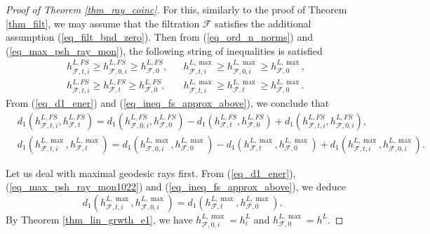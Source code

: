\documentclass[12pt]{article}
\numberwithin{equation}{section}
\theoremstyle{theorem}
\theoremstyle{definition}
\theoremstyle{remark}
\begin{document}
\begin{proof}[Proof of Theorem \ref{thm_ray_coinc}]
		 For this, similarly to the proof of Theorem \ref{thm_filt}, we may assume that the filtration $\mathcal{F}$ satisfies the additional assumption (\ref{eq_filt_bnd_zero}).
		 Then from (\ref{eq_ord_n_norms}) and (\ref{eq_max_psh_ray_mon}), the following string of inequalities is satisfied
		\begin{equation}\label{eq_ineq_fs_approx_above}
		\begin{aligned}
			&
			h^{L, FS}_{\mathcal{F}, t, i} \geq h^{L, FS}_{\mathcal{F}, 0, i} \geq h^{L, FS}_{\mathcal{F}, 0},
			&&
			h^{L, \max}_{\mathcal{F}, t, i} \geq h^{L, \max}_{\mathcal{F}, 0, i} \geq h^{L, \max}_{\mathcal{F}, 0},
			\\
			&
			h^{L, FS}_{\mathcal{F}, t, i} \geq h^{L, FS}_{\mathcal{F}, t} \geq h^{L, FS}_{\mathcal{F}, 0},
			&&
			h^{L, \max}_{\mathcal{F}, t, i} \geq h^{L, \max}_{\mathcal{F}, t} \geq h^{L, \max}_{\mathcal{F}, 0}.
		\end{aligned}
		\end{equation}
		From (\ref{eq_d1_ener}) and (\ref{eq_ineq_fs_approx_above}), we conclude that 
		\begin{equation}\label{eq_equal_b_fs_0}
		\begin{aligned}
			&
			d_1(h^{L, FS}_{\mathcal{F}, t, i}, h^{L, FS}_{\mathcal{F}, t}) 
			= 
			d_1(h^{L, FS}_{\mathcal{F}, 0, i}, h^{L, FS}_{\mathcal{F}, 0})
			-
			d_1(h^{L, FS}_{\mathcal{F}, t}, h^{L, FS}_{\mathcal{F}, 0})
			+
			d_1(h^{L, FS}_{\mathcal{F}, t, i}, h^{L, FS}_{\mathcal{F}, 0, i}),
			\\
			&
			d_1(h^{L, \max}_{\mathcal{F}, t, i}, h^{L, \max}_{\mathcal{F}, t}) 
			= 
			d_1(h^{L, \max}_{\mathcal{F}, 0, i}, h^{L, \max}_{\mathcal{F}, 0})
			-
			d_1(h^{L, \max}_{\mathcal{F}, t}, h^{L, \max}_{\mathcal{F}, 0})
			+
			d_1(h^{L, \max}_{\mathcal{F}, t, i}, h^{L, \max}_{\mathcal{F}, 0, i}).
		\end{aligned}
		\end{equation}
		\par 
		Let us deal with maximal geodesic rays first. 
		From (\ref{eq_d1_ener}), (\ref{eq_max_psh_ray_mon1022}) and (\ref{eq_ineq_fs_approx_above}), we deduce
		\begin{equation}\label{eq_equal_b_fs_00}
			d_1(h^{L, \max}_{\mathcal{F}, t, i}, h^{L, \max}_{\mathcal{F}, 0, i})
			=
			d_1(h^{L, \max}_{\mathcal{F}, t}, h^{L, \max}_{\mathcal{F}, 0}).
		\end{equation}
		By Theorem \ref{thm_lin_grwth_e1}, we have $h^{L, \max}_{\mathcal{F}, 0, i} = h^L_i$ and $h^{L, \max}_{\mathcal{F}, 0} = h^L$. 

\end{proof}
\end{document}
